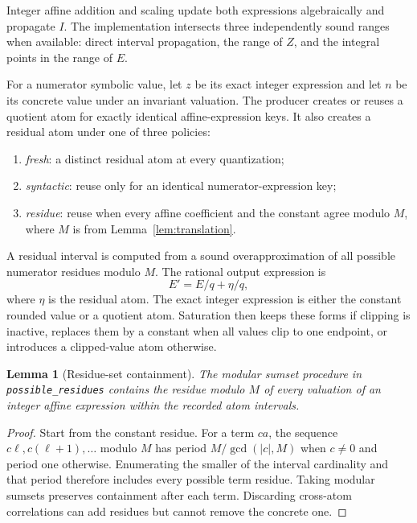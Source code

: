 \documentclass[11pt]{article}
\newtheorem{lemma}[definition]{Lemma}
\begin{document}
Integer affine addition and scaling update both expressions algebraically and propagate $I$. The implementation intersects three independently sound ranges when available: direct interval propagation, the range of $Z$, and the integral points in the range of $E$.

For a numerator symbolic value, let $z$ be its exact integer expression and let $n$ be its concrete value under an invariant valuation. The producer creates or reuses a quotient atom for exactly identical affine-expression keys. It also creates a residual atom under one of three policies:
\begin{enumerate}
\item \emph{fresh}: a distinct residual atom at every quantization;
\item \emph{syntactic}: reuse only for an identical numerator-expression key;
\item \emph{residue}: reuse when every affine coefficient and the constant agree modulo $M$, where $M$ is from Lemma~\ref{lem:translation}.
\end{enumerate}
A residual interval is computed from a sound overapproximation of all possible numerator residues modulo $M$. The rational output expression is
\[
  E'=E/q+\eta/q,
\]
where $\eta$ is the residual atom. The exact integer expression is either the constant rounded value or a quotient atom. Saturation then keeps these forms if clipping is inactive, replaces them by a constant when all values clip to one endpoint, or introduces a clipped-value atom otherwise.

\begin{lemma}[Residue-set containment]\label{lem:residue-set}
The modular sumset procedure in \texttt{possible\_residues} contains the residue modulo $M$ of every valuation of an integer affine expression within the recorded atom intervals.
\end{lemma}
\begin{proof}
Start from the constant residue. For a term $ca$, the sequence $c\ell,c(\ell+1),\ldots$ modulo $M$ has period $M/\gcd(|c|,M)$ when $c\ne0$ and period one otherwise. Enumerating the smaller of the interval cardinality and that period therefore includes every possible term residue. Taking modular sumsets preserves containment after each term. Discarding cross-atom correlations can add residues but cannot remove the concrete one.
\end{proof}
\end{document}
